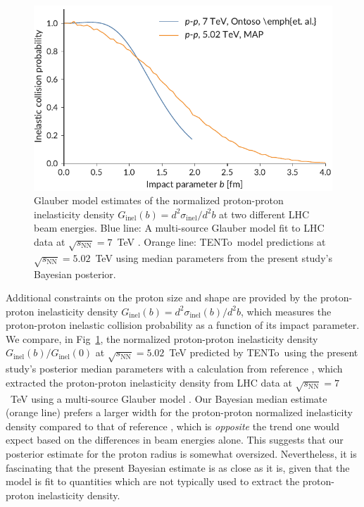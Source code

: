 \documentclass[aps,prc,reprint,amsmath,nofootinbib]{revtex4-1}
\newcommand{\trento}{T\raisebox{-0.5ex}{R}ENTo}
\newcommand{\sqrts}{\sqrt{s_\mathrm{NN}}}
\begin{document}
\begin{figure}[b]
  \includegraphics{inelasticity_profile}
  \caption{
    \label{fig:inelasticity_profile}
    Glauber model estimates of the normalized proton-proton inelasticity density $G_\mathrm{inel}(b) = d^2\sigma_\mathrm{inel}/d^2b$ at two different LHC beam energies.
    Blue line: A multi-source Glauber model fit to LHC data at $\sqrts=7$~TeV \cite{Albacete:2016pmp}.
    Orange line: \trento\ model predictions at $\sqrts=5.02$~TeV using median parameters from the present study's Bayesian posterior.
  }
\end{figure}

Additional constraints on the proton size and shape are provided by the proton-proton inelasticity density $G_\mathrm{inel}(b) = d^2\sigma_\mathrm{inel}(b)/d^2b$, which measures the proton-proton inelastic collision probability as a function of its impact parameter.
We compare, in Fig~\ref{fig:inelasticity_profile}, the normalized proton-proton inelasticity density $G_\mathrm{inel}(b) / G_\mathrm{inel}(0)$ at $\sqrts=5.02$~TeV predicted by \trento\ using the present study's posterior median parameters with a calculation from reference \cite{Albacete:2016pmp}, which extracted the proton-proton inelasticity density from LHC data at $\sqrts=7$~TeV using a multi-source Glauber model \cite{Albacete:2016pmp}.
Our Bayesian median estimate (orange line) prefers a larger width for the proton-proton normalized inelasticity density compared to that of reference \cite{Albacete:2016pmp}, which is \emph{opposite} the trend one would expect based on the differences in beam energies alone.
This suggests that our posterior estimate for the proton radius is somewhat oversized.
Nevertheless, it is fascinating that the present Bayesian estimate is as close as it is, given that the model is fit to quantities which are not typically used to extract the proton-proton inelasticity density.
\end{document}
